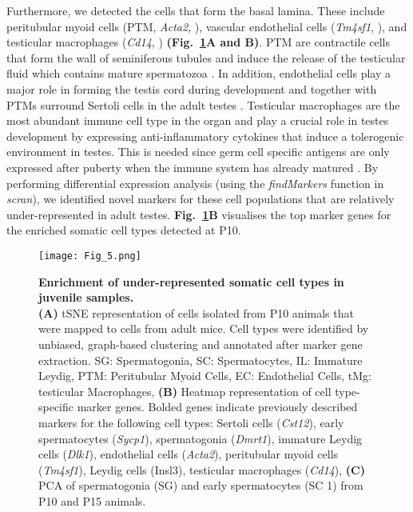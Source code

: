 Furthermore, we detected the cells that form the basal lamina. These include peritubular myoid cells (PTM, \textit{Acta2}, \citep{Cool2008}), vascular endothelial cells (\textit{Tm4sf1}, \citep{Shih2009}), and testicular macrophages (\textit{Cd14}, \citep{Kitchens2000}) \textbf{(Fig.~\ref{fig3:somatic_cells}A and B)}. PTM are contractile cells that form the wall of seminiferous tubules and induce the release of the testicular fluid which contains mature spermatozoa \citep{Diez-Torre2011}. In addition, endothelial cells play a major role in forming the testis cord during development and together with PTMs surround Sertoli cells in the adult testes \citep{Combes2009}. Testicular macrophages are the most abundant immune cell type in the organ and play a crucial role in testes development by expressing anti-inflammatory cytokines that induce a tolerogenic environment in testes. This is needed since germ cell specific antigens are only expressed after puberty when the immune system has already matured \citep{Fijak2006}. By performing differential expression analysis (using the \emph{findMarkers} function in \emph{scran}), we identified novel markers for these cell populations that are relatively under-represented in adult testes. \textbf{Fig.~\ref{fig3:somatic_cells}B} visualises the top marker genes for the enriched somatic cell types detected at P10.\\

\begin{figure}[!h]
\centering
\texttt{[image: Fig\_5.png]}
\caption[Enrichment of under-represented somatic cell types in juvenile samples]{\textbf{Enrichment of under-represented somatic cell types in juvenile samples.} \\
\textbf{(A)} tSNE representation of cells isolated from P10 animals that were mapped to cells from adult mice. Cell types were identified by unbiased, graph-based clustering and annotated after marker gene extraction. SG: Spermatogonia, SC: Spermatocytes, IL: Immature Leydig, PTM: Peritubular Myoid Cells, EC: Endothelial Cells, tMg: testicular Macrophages, \textbf{(B)} Heatmap representation of cell type-specific marker genes. Bolded genes indicate previously described markers for the following cell types: Sertoli cells (\textit{Cst12}), early spermatocytes (\textit{Sycp1}), spermatogonia (\textit{Dmrt1}), immature Leydig cells (\textit{Dlk1}), endothelial cells (\textit{Acta2}), peritubular myoid cells (\textit{Tm4sf1}), Leydig cells (Insl3), testicular macrophages (\textit{Cd14}), \textbf{(C)} PCA of spermatogonia (SG) and early spermatocytes (SC 1) from P10 and P15 animals. 
}
\label{fig3:somatic_cells}
\end{figure}

